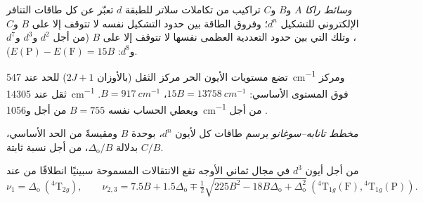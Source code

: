 \begin{definition}\label{def:b3:complex-spectra-magnetism:racah}
\emph{وسائط راكا} $A$ و$B$ و$C$ تراكيب من
تكاملات سلاتر للطبقة $d$ تعبّر عن كل طاقات التنافر الإلكتروني
للتشكيل $d^n$؛ وفروق الطاقة بين حدود
التشكيل نفسه لا تتوقف إلا على $B$ و$C$، وتلك التي بين حدود التعددية
العظمى نفسها لا تتوقف إلا على $B$ (من أجل $d^2$ و$d^3$ و$d^7$ و$d^8$: $E(\mathrm P) - E(\mathrm F) = 15B$).
\end{definition}

\begin{example}\label{ex:b3:complex-spectra-magnetism:free-B}
تضع مستويات الأيون الحر  مركز الثقل (بالأوزان $2J + 1$) للحد  عند
\qty{547}{cm^{-1}} ومركز ثقل  عند \qty{14305}{cm^{-1}} فوق المستوى الأساسي: $15B = \qty{13758}{cm^{-1}}$،
$B = \qty{917}{cm^{-1}}$. ويعطي الحساب نفسه $B = 755$ من أجل  و\qty{1056}{cm^{-1}} من أجل
.
\end{example}

\begin{definition}\label{def:b3:complex-spectra-magnetism:tanabe-sugano}
\emph{مخطط تانابه--سوغانو} يرسم طاقات
كل  لأيون $d^n$، بوحدة $B$ ومقيسةً من
الحد الأساسي، بدلالة $\Delta_{\mathrm o}/B$، من أجل نسبة ثابتة $C/B$.
\end{definition}

\begin{proposition}\label{prop:b3:complex-spectra-magnetism:d3-bands}
من أجل أيون $d^3$ في مجال ثماني الأوجه تقع الانتقالات المسموحة سبينيًا انطلاقًا من  عند
\[
  \nu_1 = \Delta_{\mathrm o}\ (^4\mathrm T_{2g}), \qquad
  \nu_{2,3} = 7.5B + 1.5\Delta_{\mathrm o} \mp \tfrac12\sqrt{225B^2 - 18B\Delta_{\mathrm o} + \Delta_{\mathrm o}^2}\ (^4\mathrm T_{1g}(\mathrm F), {}^4\mathrm T_{1g}(\mathrm P)).
\]
\end{proposition}

